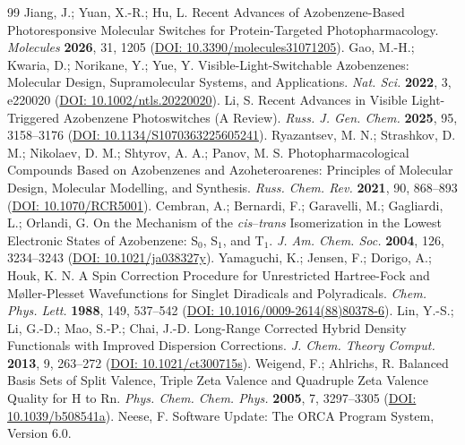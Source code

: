 \documentclass[11pt,a4paper]{article}
\begin{document}
\begin{thebibliography}{99}\small\itemsep1pt
 Jiang, J.; Yuan, X.-R.; Hu, L. Recent Advances of Azobenzene-Based Photoresponsive
  Molecular Switches for Protein-Targeted Photopharmacology. \textit{Molecules} \textbf{2026}, 31, 1205
  (\href{https://doi.org/10.3390/molecules31071205}{DOI: 10.3390/molecules31071205}).
 Gao, M.-H.; Kwaria, D.; Norikane, Y.; Yue, Y. Visible-Light-Switchable Azobenzenes:
  Molecular Design, Supramolecular Systems, and Applications. \textit{Nat. Sci.} \textbf{2022}, 3, e220020
  (\href{https://doi.org/10.1002/ntls.20220020}{DOI: 10.1002/ntls.20220020}).
 Li, S. Recent Advances in Visible Light-Triggered Azobenzene Photoswitches (A Review).
  \textit{Russ. J. Gen. Chem.} \textbf{2025}, 95, 3158–3176
  (\href{https://doi.org/10.1134/S1070363225605241}{DOI: 10.1134/S1070363225605241}).
 Ryazantsev, M. N.; Strashkov, D. M.; Nikolaev, D. M.; Shtyrov, A. A.; Panov, M. S.
  Photopharmacological Compounds Based on Azobenzenes and Azoheteroarenes: Principles of Molecular Design,
  Molecular Modelling, and Synthesis. \textit{Russ. Chem. Rev.} \textbf{2021}, 90, 868–893
  (\href{https://doi.org/10.1070/RCR5001}{DOI: 10.1070/RCR5001}).
 Cembran, A.; Bernardi, F.; Garavelli, M.; Gagliardi, L.; Orlandi, G.
  On the Mechanism of the \textit{cis}–\textit{trans} Isomerization in the Lowest Electronic States of
  Azobenzene: S$_0$, S$_1$, and T$_1$. \textit{J. Am. Chem. Soc.} \textbf{2004}, 126, 3234–3243
  (\href{https://doi.org/10.1021/ja038327y}{DOI: 10.1021/ja038327y}).
 Yamaguchi, K.; Jensen, F.; Dorigo, A.; Houk, K. N. A Spin Correction Procedure for
  Unrestricted Hartree-Fock and Møller-Plesset Wavefunctions for Singlet Diradicals and Polyradicals.
  \textit{Chem. Phys. Lett.} \textbf{1988}, 149, 537–542
  (\href{https://doi.org/10.1016/0009-2614(88)80378-6}{DOI: 10.1016/0009-2614(88)80378-6}).
 Lin, Y.-S.; Li, G.-D.; Mao, S.-P.; Chai, J.-D. Long-Range Corrected Hybrid Density
  Functionals with Improved Dispersion Corrections. \textit{J. Chem. Theory Comput.} \textbf{2013}, 9, 263–272
  (\href{https://doi.org/10.1021/ct300715s}{DOI: 10.1021/ct300715s}).
 Weigend, F.; Ahlrichs, R. Balanced Basis Sets of Split Valence, Triple Zeta Valence and
  Quadruple Zeta Valence Quality for H to Rn. \textit{Phys. Chem. Chem. Phys.} \textbf{2005}, 7, 3297–3305
  (\href{https://doi.org/10.1039/b508541a}{DOI: 10.1039/b508541a}).
 Neese, F. Software Update: The ORCA Program System, Version 6.0.

\end{thebibliography}
\end{document}
